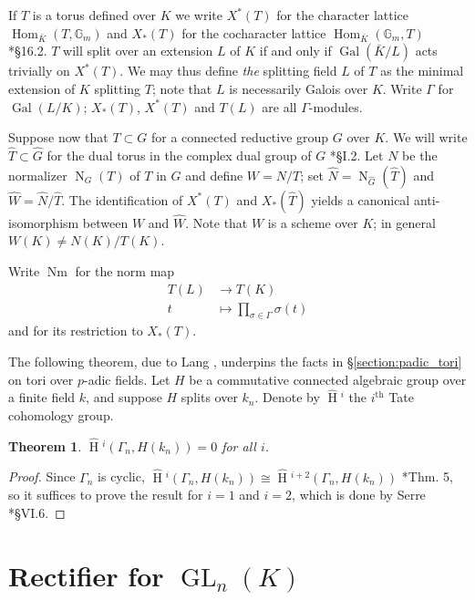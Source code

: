 \documentclass{compositio}
\theoremstyle{plain}
\newtheorem{theorem}{Theorem}[section]
\newcommand{\HT}[1]{\hat{\HH}{}^{#1}}
\theoremstyle{definition}
\numberwithin{equation}{section}
\DeclareMathOperator{\Gal}{Gal}
\DeclareMathOperator{\HH}{H}
\DeclareMathOperator{\Nm}{Nm}
\DeclareMathOperator{\Hom}{Hom}
\DeclareMathOperator{\GL}{GL}
\newcommand{\Gm}{\mathbb{G}_m}
\newcommand{\Normalizer}[2]{\operatorname{N}_{#2}(#1)}
\begin{document}
If $T$ is a torus defined over $K$ we write $X^*(T)$
for the character lattice $\Hom_{\bar{K}}(T, \Gm)$ and $X_*(T)$ for the
cocharacter lattice $\Hom_{\bar{K}}(\Gm, T)$ \cite{humphreys:LinAlgGrps}*{\S 16.2}.
$T$ will split over an extension
$L$ of $K$ if and only if $\Gal(\bar{K}/L)$ acts trivially on $X^*(T)$.
We may thus define \emph{the} splitting field $L$ of $T$ as the
minimal extension of $K$ splitting $T$; note that $L$ is necessarily
Galois over $K$.  Write $\Gamma$ for $\Gal(L/K)$; $X_*(T)$, $X^*(T)$ and $T(L)$
are all $\Gamma$-modules.

Suppose now that $T \subset G$ for a connected reductive group $G$ over $K$.
We will write $\hat{T} \subset \hat{G}$ for the dual torus in the complex dual group of $G$ \cite{borel:79a}*{\S I.2}.
Let $N$ be the normalizer $\Normalizer{T}{G}$ of $T$ in $G$ and define $W = N/T$;
set $\hat{N} = \Normalizer{\hat{T}}{\hat{G}}$ and
$\hat{W} = \hat{N}/\hat{T}$.  The identification of $X^*(T)$ and $X_*(\hat{T})$
yields a canonical anti-isomorphism between $W$ and $\hat{W}$.
Note that $W$ is a scheme over $K$; in general $W(K) \ne N(K) / T(K)$.

Write $\Nm$ for the norm map
\begin{align*}
T(L) &\rightarrow T(K) \\
t &\mapsto \prod_{\sigma \in \Gamma} \sigma(t)
\end{align*}
and for its restriction to $X_*(T)$.

The following theorem, due to Lang \cite{lang:56a}, underpins the facts in
\S\ref{section:padic_tori} on tori over $p$-adic fields.
Let $H$ be a commutative connected algebraic group over a
finite field $k$, and suppose $H$ splits over $k_n$.  Denote by $\HT{i}$ the $i^{\mathrm{th}}$
Tate cohomology group.

\begin{theorem} \label{thm:lang}
$\HT{i}(\Gamma_n, H(k_n)) = 0$ for all $i$.
\end{theorem}
\begin{proof}
Since $\Gamma_n$ is cyclic,
$\HT{i}(\Gamma_n, H(k_n)) \cong \HT{i+2}(\Gamma_n, H(k_n))$ \cite{atiyah-wall:CohomologyGrps}*{Thm. 5},
so it suffices to prove the result for $i=1$ and $i=2$, which is done
by Serre \cite{serre:AlgGrpsClassFields}*{\S VI.6}.
\end{proof}

\section{Rectifier for $\GL_{n}(K)$} \label{section:BH_recall}
\end{document}

